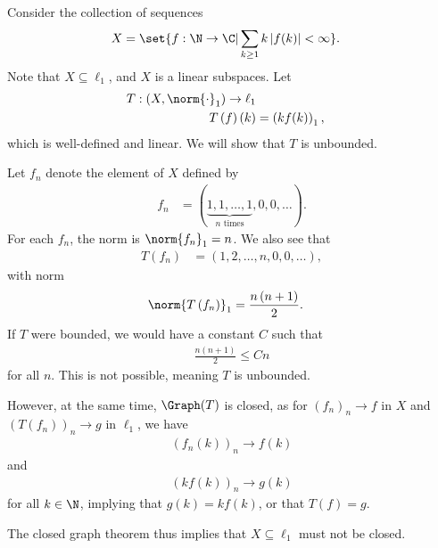 \documentclass[10pt]{mypackage}
\begin{document}
  \begin{example}
    Consider the collection of sequences
    \begin{align*}
      X &= \set{f: \N\rightarrow\C| \sum_{k\geq 1}k\left\vert f(k) \right\vert < \infty}.
    \end{align*}
    Note that $X\subseteq \ell_1$, and $X$ is a linear subspaces. Let
    \begin{align*}
      T: \left(X,\norm{\cdot}_1\right) \rightarrow \ell_1\\
      T\left(f\right)\left(k\right) &= \left(kf(k)\right)_1,
    \end{align*}
    which is well-defined and linear. We will show that $T$ is unbounded.\newline

    Let $f_n$ denote the element of $X$ defined by
    \begin{align*}
      f_n &= (\underbrace{1,1,\dots,1}_{\text{$n$ times}},0,0,\dots).
    \end{align*}
    For each $f_n$, the norm is $\norm{f_n}_1 = n$. We also see that
    \begin{align*}
      T\left(f_n\right) &= \left(1,2,\dots,n,0,0,\dots\right),
    \end{align*}
    with norm
    \begin{align*}
      \norm{T\left(f_n\right)}_1 &= \frac{n\left(n+1\right)}{2}.
    \end{align*}
    If $T$ were bounded, we would have a constant $C$ such that
    \begin{align*}
      \frac{n\left(n+1\right)}{2}\leq Cn
    \end{align*}
    for all $n$. This is not possible, meaning $T$ is unbounded.\newline

    However, at the same time, $\Graph(T)$ is closed, as for $\left(f_n\right)_n\rightarrow f$ in $X$ and $\left(T\left(f_n\right)\right)_n\rightarrow g$ in $\ell_1$, we have
    \begin{align*}
      \left(f_n\left(k\right)\right)_n\rightarrow f(k)
    \end{align*}
    and
    \begin{align*}
      \left(kf(k)\right)_n\rightarrow g(k)
    \end{align*}
    for all $k\in \N$, implying that $g(k) = kf(k)$, or that $T\left(f\right) = g$.\newline

    The closed graph theorem thus implies that $X\subseteq \ell_1$ must not be closed.
  \end{example}
\end{document}
